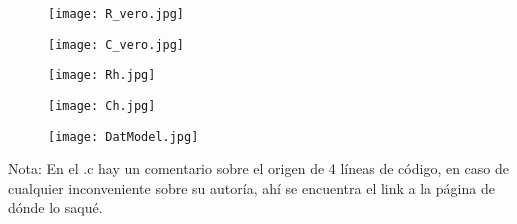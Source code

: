 \documentclass[12pt,letterpaper]{article}
\begin{document}
\begin{figure}[H]
\texttt{[image: R\_vero.jpg]}
\centering
\end{figure}


\begin{figure}[H]
\texttt{[image: C\_vero.jpg]}
\centering
\end{figure}


\begin{figure}[H]
\texttt{[image: Rh.jpg]}
\centering
\end{figure}

\begin{figure}[H]
\texttt{[image: Ch.jpg]}
\centering
\end{figure}



\begin{figure}[H]
\texttt{[image: DatModel.jpg]}
\centering
\end{figure}

Nota: En el .c hay un comentario sobre el origen de 4 líneas de código, en caso de cualquier inconveniente sobre su autoría, ahí se encuentra el link a la página de dónde lo saqué.
\end{document}
